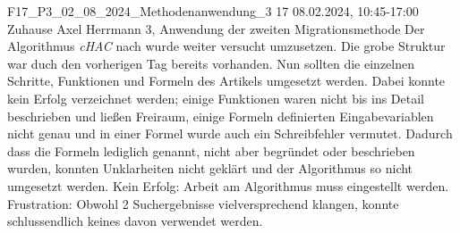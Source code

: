 \fieldnote
{F17\_P3\_02\_08\_2024\_Methodenanwendung\_3}
{17}
{08.02.2024, 10:45-17:00}
{Zuhause}
{Axel Herrmann}
{3, Anwendung der zweiten Migrationsmethode}
{
  Der Algorithmus \emph{cHAC} nach  wurde weiter versucht umzusetzen.
  Die grobe Struktur war duch den vorherigen Tag bereits vorhanden.
  Nun sollten die einzelnen Schritte, Funktionen und Formeln des Artikels umgesetzt werden.
  Dabei konnte kein Erfolg verzeichnet werden; einige Funktionen waren nicht bis ins Detail beschrieben und ließen Freiraum, einige Formeln definierten Eingabevariablen nicht genau und in einer Formel wurde auch ein Schreibfehler vermutet.
  Dadurch dass die Formeln lediglich genannt, nicht aber begründet oder beschrieben wurden, konnten Unklarheiten nicht geklärt und der Algorithmus so nicht umgesetzt werden.
}
{
}
{
}
{
  Kein Erfolg: Arbeit am Algorithmus muss eingestellt werden.
}
{
  Frustration: Obwohl 2 Suchergebnisse vielversprechend klangen, konnte schlussendlich keines davon verwendet werden.
}
